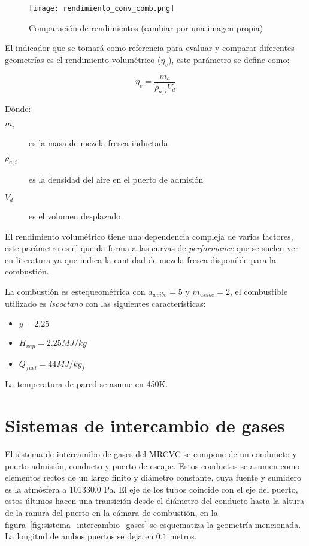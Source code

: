 \begin{figure}
    \centering
    \texttt{[image: rendimiento\_conv\_comb.png]}
    \caption{Comparación de rendimientos (cambiar por una imagen propia)}\label{fig:comparacion_rendimientos}
\end{figure}

El indicador que se tomará como referencia para evaluar y comparar diferentes
geometrías es el rendimiento volumétrico ($\eta_v$), este parámetro se define
como:

\begin{equation}
    \eta_v = \frac{m_a}{\rho_{a,i}V_d}
\end{equation}

Dónde:
%
\begin{description}
    \item[$m_i$] es la masa de mezcla fresca inductada
    \item[$\rho_{a,i}$] es la densidad del aire en el puerto de admisión
    \item[$V_d$] es el volumen desplazado
\end{description}

El rendimiento volumétrico tiene una dependencia compleja de varios factores,
este parámetro es el que da forma a las curvas de \emph{performance} que se
suelen ver en literatura ya que indica la cantidad de mezcla fresca disponible
para la combustión. 
%

La combustión es estequeométrica con $a_{weibe}=5$ y $m_{weibe}=2$, el combustible utilizado
es \emph{isooctano} con las siguientes características:
\begin{itemize}
    \item $y = 2.25$
    \item $H_{vap} = 2.25 MJ/kg$
    \item $Q_{fuel} = 44 MJ/kg_f$
\end{itemize}

La temperatura de pared se asume en 450K.


\section{Sistemas de intercambio de gases}
%
El sistema de intercamibo de gases del MRCVC se compone de un conduncto y puerto
admisión, conducto y puerto de escape.
%
Estos conductos se asumen como elementos rectos de un largo finito y diámetro
constante, cuya fuente y sumidero es la atmósfera a 101330.0 Pa.
%
El eje de los tubos coincide con el eje del puerto, estos últimos hacen una
transición desde el diámetro del conducto hasta la altura de la ranura del
puerto en la cámara de combustión, en la
figura~\ref{fig:sistema_intercambio_gases} se esquematiza la geometría
mencionada.
%
La longitud de ambos puertos se deja en $0.1$ metros.

